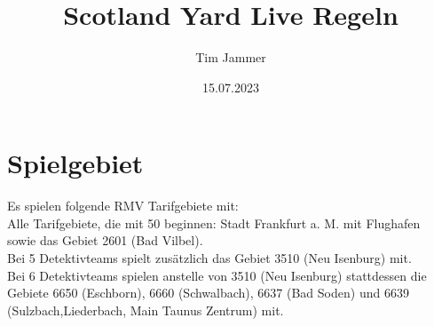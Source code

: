 \documentclass[12pt,a4paper]{article}
\title{Scotland Yard Live Regeln}
\author{Tim Jammer}
\date{15.07.2023}
\begin{document}
\maketitle


\section{Spielgebiet}
Es spielen folgende RMV Tarifgebiete mit:\\
Alle Tarifgebiete, die mit 50 beginnen: Stadt Frankfurt a. M. mit Flughafen\\
sowie das Gebiet 2601 (Bad Vilbel).\\
Bei 5 Detektivteams spielt zusätzlich das Gebiet 3510 (Neu Isenburg) mit.\\
Bei 6 Detektivteams spielen anstelle von 3510 (Neu Isenburg) stattdessen die Gebiete 6650 (Eschborn), 6660 (Schwalbach), 6637 (Bad Soden)  und 6639 (Sulzbach,Liederbach, Main Taunus Zentrum) mit.
\end{document}

